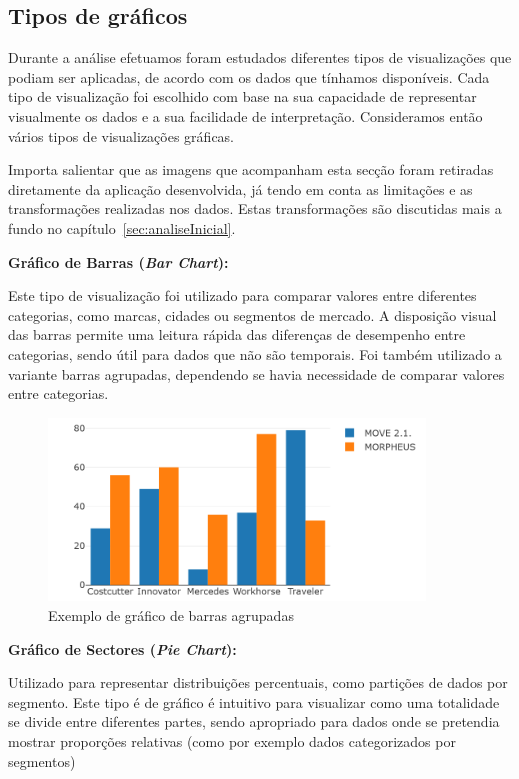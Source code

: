 \subsection{Tipos de gráficos}

Durante a análise efetuamos foram estudados diferentes tipos de visualizações que podiam ser aplicadas, de acordo com os dados que tínhamos disponíveis. Cada tipo de visualização foi escolhido com base na sua capacidade de representar visualmente os dados e a sua facilidade de interpretação.  Consideramos então vários tipos de visualizações gráficas. 

Importa salientar que as imagens que acompanham esta secção foram retiradas diretamente da aplicação desenvolvida, já tendo em conta as limitações e as transformações realizadas nos dados. Estas transformações são discutidas mais a fundo no capítulo~\ref{sec:analiseInicial}.

\textbf{Gráfico de Barras (\textit{Bar Chart}):}

Este tipo de visualização foi utilizado para comparar valores entre diferentes categorias, como marcas, cidades ou segmentos de mercado. A disposição visual das barras permite uma leitura rápida das diferenças de desempenho entre categorias, sendo útil para dados que não são temporais. Foi também utilizado a variante barras agrupadas, dependendo se havia necessidade de comparar valores entre categorias.



\begin{figure}[H]
\centering
\includegraphics[max width=10cm]{./img/agrupada}
\caption{Exemplo de gráfico de barras agrupadas}
\end{figure}

\textbf{Gráfico de Sectores (\textit{Pie Chart}):}  

Utilizado para representar distribuições percentuais, como partições de dados por segmento. Este tipo é de gráfico é intuitivo para visualizar como uma totalidade se divide entre diferentes partes, sendo apropriado para dados onde se pretendia mostrar proporções relativas (como por exemplo dados categorizados por segmentos)

